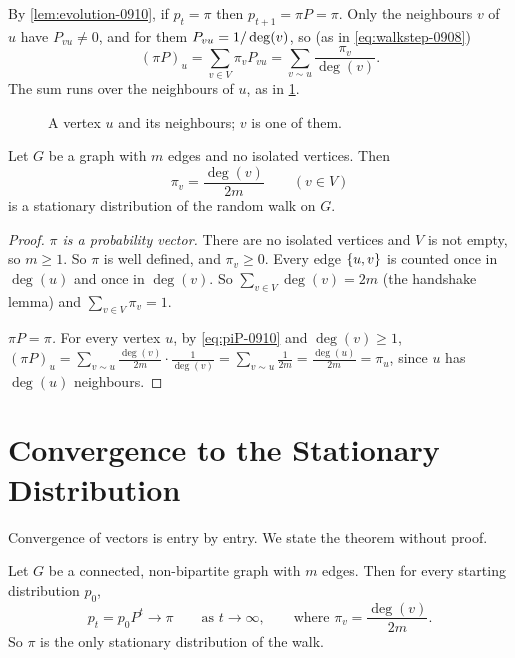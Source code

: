 By \cref{lem:evolution-0910}, if $p_t = \pi$ then $p_{t+1} = \pi P = \pi$. Only the neighbours $v$
of $u$ have $P_{vu} \neq 0$, and for them $P_{vu} = 1/\deg(v)$, so (as in
\cref{eq:walkstep-0908})
\begin{equation}\label{eq:piP-0910}
    (\pi P)_u = \sum_{v \in V} \pi_v P_{vu} = \sum_{v \sim u} \frac{\pi_v}{\deg(v)}.
\end{equation}
The sum runs over the neighbours of $u$, as in \cref{fig:star-0910}.

\begin{figure}[ht]
    \centering
    \caption{A vertex $u$ and its neighbours; $v$ is one of them.}
    \label{fig:star-0910}
\end{figure}

\begin{theorem}\label{thm:stationary-0910}
    Let $G$ be a graph with $m$ edges and no isolated vertices. Then
    \[\pi_v = \frac{\deg(v)}{2m} \qquad (v \in V)\]
    is a stationary distribution of the random walk on $G$.
\end{theorem}

\begin{proof}
    \emph{$\pi$ is a probability vector.} There are no isolated vertices and $V$ is not empty, so
    $m \geq 1$. So $\pi$ is well defined, and $\pi_v \geq 0$. Every edge $\left\lbrace u,v\right\rbrace$ is counted
    once in $\deg(u)$ and once in $\deg(v)$. So $\sum_{v \in V} \deg(v) = 2m$ (the handshake lemma)
    and $\sum_{v \in V} \pi_v = 1$.

    \emph{$\pi P = \pi$.} For every vertex $u$, by \cref{eq:piP-0910} and $\deg(v) \geq 1$,
    $(\pi P)_u = \sum_{v \sim u} \frac{\deg(v)}{2m} \cdot \frac{1}{\deg(v)} = \sum_{v \sim u} \frac{1}{2m}
        = \frac{\deg(u)}{2m} = \pi_u$,
    since $u$ has $\deg(u)$ neighbours.
\end{proof}

\section{Convergence to the Stationary Distribution}

Convergence of vectors is entry by entry. We state the theorem without proof.

\begin{theorem}\label{thm:convergence-0910}
    Let $G$ be a connected, non-bipartite graph with $m$ edges. Then for every starting distribution
    $p_0$,
    \[p_t = p_0 P^t \longrightarrow \pi \qquad \text{as } t \to \infty, \qquad \text{where } \pi_v = \frac{\deg(v)}{2m}.\]
    So $\pi$ is the only stationary distribution of the walk.
\end{theorem}
